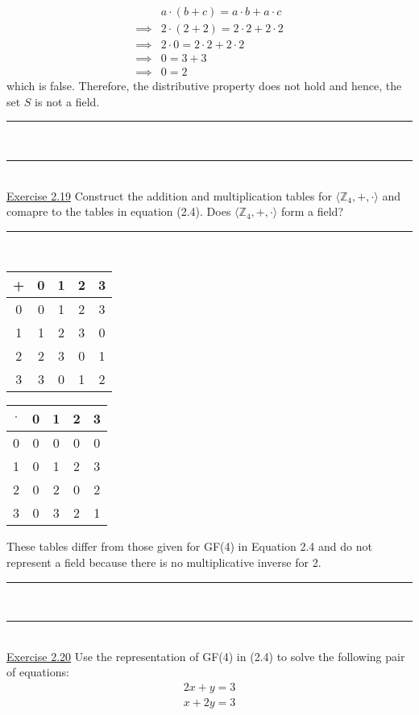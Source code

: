 \documentclass{article}
\newcommand{\problemsep}{\leavevmode\\[0.05in] \rule[\baselineskip/4]{\textwidth}{1pt} \\[0.005in] \rule[\baselineskip]{\textwidth}{1pt}\vspace{-\baselineskip}\leavevmode\\[0.05in]}
\newcommand{\statementsep}{\leavevmode\\[0.005in] \rule[\baselineskip/4]{\textwidth}{0.4pt}\leavevmode\\[0.005in]}
\begin{document}
\begin{equation*}\begin{aligned}
	       & a\cdot (b + c) = a\cdot b + a\cdot c \\
\implies & 2\cdot (2 + 2) = 2\cdot 2 + 2\cdot 2\\
\implies & 2\cdot 0 = 2\cdot 2 + 2\cdot 2 \\
\implies & 0 = 3 + 3 \\
\implies & 0 = 2
\end{aligned}\end{equation*}
which is false. Therefore, the distributive property does not hold and hence, the set $S$ is not a field.
\problemsep
\noindent\underline{Exercise 2.19}
Construct the addition and multiplication tables for $\langle \mathbb{Z}_4,+,\cdot \rangle$ and comapre to the tables in equation (2.4). Does $\langle \mathbb{Z}_4,+,\cdot \rangle$ form a field?
\statementsep
\begin{center}
	\begin{tabular}{c | c c c c}
		 + & 0 & 1 & 2 & 3 \\ \hline
     0      & 0 & 1 & 2 & 3 \\
	   1      & 1 & 2 & 3 & 0 \\
     2      & 2 & 3 & 0 & 1 \\
		 3      & 3 & 0 & 1 & 2 \\
	\end{tabular}
	\qquad 
	\begin{tabular}{c | c c c c}
		$\cdot$ & 0 & 1 & 2 & 3 \\ \hline
     0      & 0 & 0 & 0 & 0 \\
	   1      & 0 & 1 & 2 & 3 \\
     2      & 0 & 2 & 0 & 2 \\
		 3      & 0 & 3 & 2 & 1 \\
	\end{tabular} 
\end{center}
These tables differ from those given for GF(4) in Equation 2.4 and do not represent a field because there is no multiplicative inverse for 2.
\problemsep
\noindent\underline{Exercise 2.20}
Use the representation of GF(4) in (2.4) to solve the following pair of equations:
\begin{equation*} \begin{aligned}
2x + y = 3 \\
x + 2y = 3 \\
\end{aligned}\end{equation*}
\end{document}
